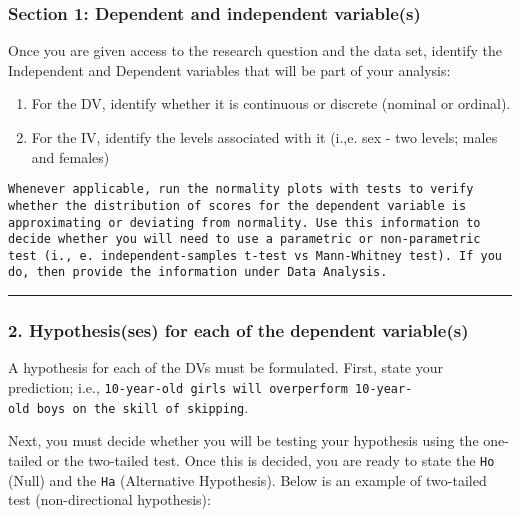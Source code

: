 \documentclass[11pt,]{article}
\begin{document}
\hypertarget{section-1-dependent-and-independent-variables}{%
\subsubsection{Section 1: Dependent and independent
variable(s)}\label{section-1-dependent-and-independent-variables}}

Once you are given access to the research question and the data set,
identify the Independent and Dependent variables that will be part of
your analysis:

\begin{enumerate}
\def\labelenumi{\alph{enumi}.}
\item
  For the DV, identify whether it is continuous or discrete (nominal or
  ordinal).
\item
  For the IV, identify the levels associated with it (i.,e. sex - two
  levels; males and females)
\end{enumerate}

\begin{verbatim}
Whenever applicable, run the normality plots with tests to verify whether the distribution of scores for the dependent variable is approximating or deviating from normality. Use this information to decide whether you will need to use a parametric or non-parametric test (i., e. independent-samples t-test vs Mann-Whitney test). If you do, then provide the information under Data Analysis.
\end{verbatim}

\begin{center}\rule{0.5\linewidth}{0.5pt}\end{center}

\hypertarget{hypothesisses-for-each-of-the-dependent-variables}{%
\subsubsection{2. Hypothesis(ses) for each of the dependent
variable(s)}\label{hypothesisses-for-each-of-the-dependent-variables}}

A hypothesis for each of the DVs must be formulated. First, state your
prediction; i.e.,
\texttt{10-year-old\ girls\ will\ overperform\ 10-year-old\ boys\ on\ the\ skill\ of\ skipping}.

Next, you must decide whether you will be testing your hypothesis using
the one-tailed or the two-tailed test. Once this is decided, you are
ready to state the \texttt{Ho} (Null) and the \texttt{Ha} (Alternative
Hypothesis). Below is an example of two-tailed test (non-directional
hypothesis):
\end{document}
